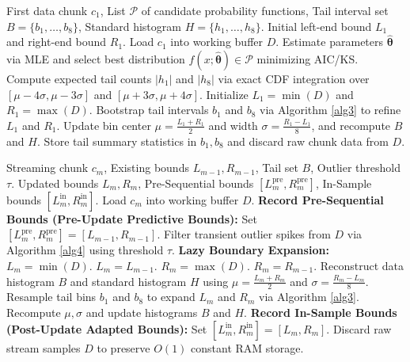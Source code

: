 \documentclass[a4paper,fleqn]{cas-sc}
\begin{document}
\begin{algorithm}[H]
\caption{Initial Chunk Fitting and Tail Summary Setup ($c_1$)}
\label{alg1}
\begin{algorithmic}[1]
\REQUIRE First data chunk $c_1$, List $\mathcal{P}$ of candidate probability functions, Tail interval set $B=\{b_1, \dots, b_8\}$, Standard histogram $H=\{h_1, \dots, h_8\}$.
\ENSURE Initial left-end bound $L_1$ and right-end bound $R_1$.
\STATE Load $c_1$ into working buffer $D$.
\STATE Estimate parameters $\hat{\boldsymbol{\theta}}$ via MLE and select best distribution $f(x; \hat{\boldsymbol{\theta}}) \in \mathcal{P}$ minimizing AIC/KS.
\STATE Compute expected tail counts $|h_1|$ and $|h_8|$ via exact CDF integration over $[\mu - 4\sigma, \mu - 3\sigma]$ and $[\mu + 3\sigma, \mu + 4\sigma]$.
\STATE Initialize $L_1 = \min(D)$ and $R_1 = \max(D)$.
    \STATE Bootstrap tail intervals $b_1$ and $b_8$ via Algorithm \ref{alg3} to refine $L_1$ and $R_1$.
    \STATE Update bin center $\mu = \frac{L_1 + R_1}{2}$ and width $\sigma = \frac{R_1 - L_1}{8}$, and recompute $B$ and $H$.
\ENDWHILE
\STATE Store tail summary statistics in $b_1, b_8$ and discard raw chunk data from $D$.
\end{algorithmic}
\end{algorithm}

\begin{algorithm}[H]
\caption{Streaming Recurrent Boundary Update with Dual Protocol Tracking ($c_m, m > 1$)}
\label{alg2}
\begin{algorithmic}[1]
\REQUIRE Streaming chunk $c_m$, Existing bounds $L_{m-1}, R_{m-1}$, Tail set $B$, Outlier threshold $\tau$.
\ENSURE Updated bounds $L_m, R_m$, Pre-Sequential bounds $[L_m^{\text{pre}}, R_m^{\text{pre}}]$, In-Sample bounds $[L_m^{\text{in}}, R_m^{\text{in}}]$.
    \STATE Load $c_m$ into working buffer $D$.
    \STATE \textbf{Record Pre-Sequential Bounds (Pre-Update Predictive Bounds):}
    \STATE \quad Set $[L_m^{\text{pre}}, R_m^{\text{pre}}] = [L_{m-1}, R_{m-1}]$.
    \STATE Filter transient outlier spikes from $D$ via Algorithm \ref{alg4} using threshold $\tau$.
    \STATE \textbf{Lazy Boundary Expansion:}
     \STATE $L_m = \min(D)$. \ELSE \STATE $L_m = L_{m-1}$. \ENDIF
     \STATE $R_m = \max(D)$. \ELSE \STATE $R_m = R_{m-1}$. \ENDIF
    \STATE Reconstruct data histogram $B$ and standard histogram $H$ using $\mu = \frac{L_m + R_m}{2}$ and $\sigma = \frac{R_m - L_m}{8}$.
        \STATE Resample tail bins $b_1$ and $b_8$ to expand $L_m$ and $R_m$ via Algorithm \ref{alg3}.
        \STATE Recompute $\mu, \sigma$ and update histograms $B$ and $H$.
    \ENDWHILE
    \STATE \textbf{Record In-Sample Bounds (Post-Update Adapted Bounds):}
    \STATE \quad Set $[L_m^{\text{in}}, R_m^{\text{in}}] = [L_m, R_m]$.
    \STATE Discard raw stream samples $D$ to preserve $O(1)$ constant RAM storage.
\ENDWHILE
\end{algorithmic}
\end{algorithm}
\end{document}
